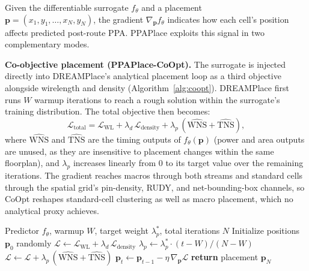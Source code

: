 \documentclass[sigconf,anonymous,review,9pt]{acmart}
\begin{document}
Given the differentiable surrogate $f_\theta$ and a placement \\
$\mathbf{p} = (x_1, y_1, \ldots, x_N, y_N)$, the gradient
$\nabla_{\mathbf{p}} f_\theta$ indicates how each cell's position
affects predicted post-route PPA. PPAPlace exploits this signal in two
complementary modes.

\textbf{Co-objective placement (PPAPlace-CoOpt).}
The surrogate is injected directly into DREAMPlace's analytical
placement loop as a third objective alongside wirelength and density
(Algorithm~\ref{alg:coopt}). DREAMPlace first runs $W$ warmup
iterations to reach a rough solution within the surrogate's training
distribution. The total objective then becomes:
\begin{equation}
\label{eq:coopt}
\mathcal{L}_{\mathrm{total}} = \mathcal{L}_{\mathrm{WL}}
  + \lambda_d\,\mathcal{L}_{\mathrm{density}}
  + \lambda_p\,(\widehat{\mathrm{WNS}} + \widehat{\mathrm{TNS}}),
\end{equation}
where $\widehat{\mathrm{WNS}}$ and $\widehat{\mathrm{TNS}}$ are the
timing outputs of $f_\theta(\mathbf{p})$ (power and area outputs are
unused, as they are insensitive to placement changes within the same
floorplan), and $\lambda_p$ increases linearly from 0 to its target value over
the remaining iterations. The gradient reaches macros through both
streams and standard cells through the spatial grid's pin-density,
RUDY, and net-bounding-box channels, so CoOpt reshapes standard-cell
clustering as well as macro placement, which no analytical proxy
achieves.

\begin{algorithm}[h]
\caption{PPAPlace-CoOpt: Co-Objective Placement}
\label{alg:coopt}
\footnotesize
\begin{algorithmic}[1]
\REQUIRE Predictor $f_\theta$, warmup $W$, target weight $\lambda_p^*$,
  total iterations $N$
\STATE Initialize positions $\mathbf{p}_0$ randomly
  \STATE $\mathcal{L} \leftarrow \mathcal{L}_{\mathrm{WL}}
    + \lambda_d\,\mathcal{L}_{\mathrm{density}}$
    \hfill{}
    \STATE $\lambda_p \leftarrow \lambda_p^* \cdot (t - W) / (N - W)$
      \hfill{}
    \STATE $\mathcal{L} \leftarrow \mathcal{L}
      + \lambda_p\,(\widehat{\mathrm{WNS}} + \widehat{\mathrm{TNS}})$
      \hfill{}
  \ENDIF
  \STATE $\mathbf{p}_t \leftarrow \mathbf{p}_{t-1}
    - \eta\,\nabla_{\mathbf{p}}\mathcal{L}$
    \hfill{}
\ENDFOR
\STATE \textbf{return} placement $\mathbf{p}_N$
\end{algorithmic}
\end{algorithm}
\end{document}
